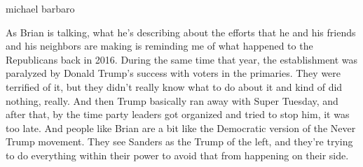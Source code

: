 michael barbaro

As Brian is talking, what he's describing about the efforts that he and
his friends and his neighbors are making is reminding me of what
happened to the Republicans back in 2016. During the same time that
year, the establishment was paralyzed by Donald Trump's success with
voters in the primaries. They were terrified of it, but they didn't
really know what to do about it and kind of did nothing, really. And
then Trump basically ran away with Super Tuesday, and after that, by the
time party leaders got organized and tried to stop him, it was too late.
And people like Brian are a bit like the Democratic version of the Never
Trump movement. They see Sanders as the Trump of the left, and they're
trying to do everything within their power to avoid that from happening
on their side.

